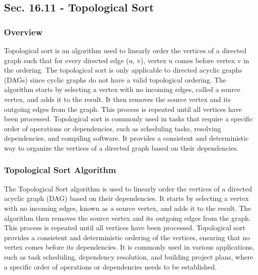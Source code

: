 \subsection*{Sec. 16.11 - Topological Sort}

\subsubsection{Overview}

Topological sort is an algorithm used to linearly order the vertices of a directed graph such that for every directed edge (u, v), vertex u comes before vertex v in the ordering. The topological sort is only applicable to directed 
acyclic graphs (DAGs) since cyclic graphs do not have a valid topological ordering. The algorithm starts by selecting a vertex with no incoming edges, called a source vertex, and adds it to the result. It then removes the source vertex 
and its outgoing edges from the graph. This process is repeated until all vertices have been processed. Topological sort is commonly used in tasks that require a specific order of operations or dependencies, such as scheduling tasks, 
resolving dependencies, and compiling software. It provides a consistent and deterministic way to organize the vertices of a directed graph based on their dependencies.

\subsubsection{Topological Sort Algorithm}

The Topological Sort algorithm is used to linearly order the vertices of a directed acyclic graph (DAG) based on their dependencies. It starts by selecting a vertex with no incoming edges, known as a source vertex, and adds it to the result. 
The algorithm then removes the source vertex and its outgoing edges from the graph. This process is repeated until all vertices have been processed. Topological sort provides a consistent and deterministic ordering of the vertices, ensuring 
that no vertex comes before its dependencies. It is commonly used in various applications, such as task scheduling, dependency resolution, and building project plans, where a specific order of operations or dependencies needs to be established.


